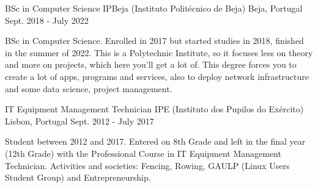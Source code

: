 


\begin{cventries}


  \cventry
  {BSc in Computer Science} %
  {IPBeja (Instituto Politécnico de Beja)} %
  {Beja, Portugal} %
  {Sept. 2018 - July 2022} %
  { %
    \begin{cvitems}
      \item {BSc in Computer Science. Enrolled in 2017 but started studies in 2018, finished in the summer of 2022. This is a Polytechnic Institute, so it focuses less on theory and more on projects, which here you'll get a lot of. This degree forces you to create a lot of apps, programs and services, also to deploy network infrastructure and some data science, project management.}
    \end{cvitems}
  }

  \cventry
  {IT Equipment Management Technician} %
  {IPE (Instituto dos Pupilos do Exército)} %
  {Lisbon, Portugal} %
  {Sept. 2012 - July 2017} %
  { %
    \begin{cvitems}
      \item {Student between 2012 and 2017. Entered on 8th Grade and left in the final year (12th Grade) with the Professional Course in IT Equipment Management Technician. Activities and societies: Fencing, Rowing, GAULP (Linux Users Student Group) and Entrepreneurship.}
    \end{cvitems}
  }


\end{cventries}
